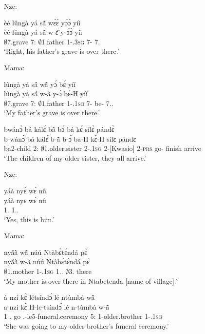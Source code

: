\noindent Nze:

\begin{exe}[(C234)]  
\exC\label{168} 
  \glll  èé lûngà yá sã́ wɛ́ɛ̀ yɔ́ɔ̀ yíì \\
          èé lûngà yá sã́ w-ɛ̂ y-ɔ́ɔ̀ yíì \\
           {\EXCL} $\emptyset$7.grave 7:{\ATT}  $\emptyset$1.father 1-{\POSS}.3\textsc{sg} 7-{\OBJ} 7.{\COP}\\
    \trans `Right, his father's grave is over there.'
\end{exe}

\noindent Mama:

\begin{exe}[(C234)] 
\exC\label{169} 
  \glll  lûngà yá sã́ wã̂ yɔ́ bɛ́ yíí \\
         lûngà yá sã́ w-ã̂ y-ɔ́ bɛ̀-H yíí  \\
          $\emptyset$7.grave  7:{\ATT}  $\emptyset$1.father 1-{\POSS}.1\textsc{sg} 7-{\OBJ} be-{\R} 7.{\DEM}.{\DIST} \\
    \trans `My father's grave is over there.'
 
\exC\label{170}
  \glll  bwánɔ̀ bá kálɛ́ bã̂ bɔ́ bá kɛ́ sílɛ̀ pándɛ̀ \\
          b-wánɔ̀ bá kálɛ́ b-ã̂ b-ɔ́ ba-H kɛ̀-H sílɛ pándɛ \\
         ba2-child 2:{\ATT}  $\emptyset$1.older.sister 2-{\POSS}.1\textsc{sg} 2-{\OBJ}[Kwasio] 2-\textsc{prs} go-{\R} finish arrive  \\
    \trans `The children of my older sister, they all arrive.'
\end{exe}

\noindent Nze:

\begin{exe}[(C234)]  
\exC\label{171} 
  \glll  yáà nyɛ̀ wɛ́ nû \\
         yáà nyɛ wɛ́ nû \\
         {\EXCL} 1.{\SBJ}  {\ID} 1.{\DEM}.{\PROX}  \\
    \trans `Yes, this is him.'
\end{exe}

\noindent Mama:

\begin{exe}[(C234)] 
\exC\label{172} 
  \glll  nyã́ã̀ wã̂ núú Ntàbɛ̀tɛ́ndá pɛ̀ \\
         nyã́ã̀ w-ã̂ núú Ntàbɛ̀tɛ́ndá pɛ̀ \\
          $\emptyset$1.mother 1-{\POSS}.1\textsc{sg} 1.{\DEM}.{\DIST} $\emptyset$3.{\PN} there  \\
    \trans `My mother is over there in Ntabetenda [name of village].'
 
\exC\label{173} 
  \glll à nzí kɛ̀ létsíndɔ́ lé ntùmbà wã̂ \\
        a nzí kɛ̀ H-le-tsíndɔ́ lé n-tùmbà w-ã̂ \\
         1 {\PROG}.{\PST}  go {\OBJ}.{\LINK}-le5-funeral.ceremony 5:{\ATT}  {\N}1-older.brother 1-{\POSS}.1\textsc{sg}   \\
    \trans `She was going to my older brother's funeral ceremony.'
\end{exe}

